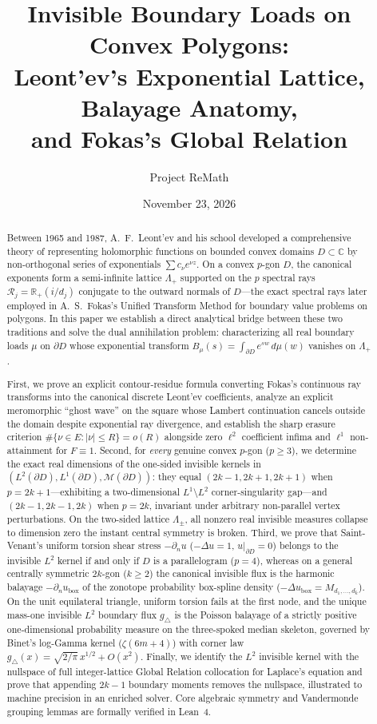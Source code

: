 \documentclass[11pt,reqno]{amsart}
\title[Invisible Boundary Loads on Convex Polygons]{Invisible Boundary Loads on Convex Polygons:\\
Leont'ev's Exponential Lattice, Balayage Anatomy,\\
and Fokas's Global Relation}
\author{Project ReMath}
\date{November 23, 2026}
\theoremstyle{definition}
\theoremstyle{remark}
\newcommand{\C}{\mathbb{C}}
\newcommand{\R}{\mathbb{R}}
\begin{document}
\begin{abstract}
Between 1965 and 1987, A.~F.~Leont'ev and his school developed a comprehensive theory of representing holomorphic functions on bounded convex domains $D \subset \C$ by non-orthogonal series of exponentials $\sum c_\nu e^{\nu z}$. On a convex $p$-gon $D$, the canonical exponents form a semi-infinite lattice $\Lambda_+$ supported on the $p$ spectral rays $\mathcal{R}_j = \R_+(i/d_j)$ conjugate to the outward normals of $D$---the exact spectral rays later employed in A.~S.~Fokas's Unified Transform Method for boundary value problems on polygons. In this paper we establish a direct analytical bridge between these two traditions and solve the dual annihilation problem: characterizing all real boundary loads $\mu$ on $\partial D$ whose exponential transform $B_\mu(s) = \int_{\partial D} e^{sw}\,d\mu(w)$ vanishes on $\Lambda_+$.

First, we prove an explicit contour-residue formula converting Fokas's continuous ray transforms into the canonical discrete Leont'ev coefficients, analyze an explicit meromorphic ``ghost wave'' on the square whose Lambert continuation cancels outside the domain despite exponential ray divergence, and establish the sharp erasure criterion $\#\{\nu \in E : |\nu|\le R\} = o(R)$ alongside zero $\ell^2$ coefficient infima and $\ell^1$ non-attainment for $F \equiv 1$. Second, for \emph{every} genuine convex $p$-gon ($p \ge 3$), we determine the exact real dimensions of the one-sided invisible kernels in $(L^2(\partial D), L^1(\partial D), \mathcal{M}(\partial D))$: they equal $(2k-1, 2k+1, 2k+1)$ when $p = 2k+1$---exhibiting a two-dimensional $L^1 \setminus L^2$ corner-singularity gap---and $(2k-1, 2k-1, 2k)$ when $p = 2k$, invariant under arbitrary non-parallel vertex perturbations. On the two-sided lattice $\Lambda_\pm$, all nonzero real invisible measures collapse to dimension zero the instant central symmetry is broken. Third, we prove that Saint-Venant's uniform torsion shear stress $-\partial_n u$ ($-\Delta u = 1$, $u|_{\partial D}=0$) belongs to the invisible $L^2$ kernel if and only if $D$ is a parallelogram ($p=4$), whereas on a general centrally symmetric $2k$-gon ($k \ge 2$) the canonical invisible flux is the harmonic balayage $-\partial_n u_{\mathrm{box}}$ of the zonotope probability box-spline density ($-\Delta u_{\mathrm{box}} = M_{d_1,\dots,d_k}$). On the unit equilateral triangle, uniform torsion fails at the first node, and the unique mass-one invisible $L^2$ boundary flux $g_\triangle$ is the Poisson balayage of a strictly positive one-dimensional probability measure on the three-spoked median skeleton, governed by Binet's log-Gamma kernel ($\zeta(6m+4)$) with corner law $g_\triangle(x) = \sqrt{2/\pi}\,x^{1/2} + O(x^2)$. Finally, we identify the $L^2$ invisible kernel with the nullspace of full integer-lattice Global Relation collocation for Laplace's equation and prove that appending $2k-1$ boundary moments removes the nullspace, illustrated to machine precision in an enriched solver. Core algebraic symmetry and Vandermonde grouping lemmas are formally verified in Lean~4.
\end{abstract}
\end{document}
